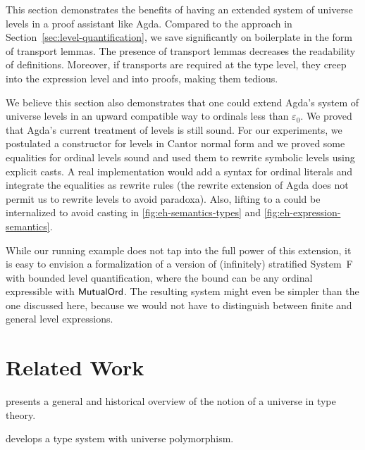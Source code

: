 \documentclass[manuscript,screen,review,anonymous]{acmart}
\begin{document}
This section demonstrates the benefits of having an extended system of
universe levels in a proof assistant like Agda. Compared to the
approach in Section~\cref{sec:level-quantification}, we save
significantly on boilerplate in the form of transport lemmas. The
presence of transport lemmas decreases the readability of
definitions. Moreover, if transports are required at the type level,
they creep into the expression level and into proofs, making them tedious.

We believe this section also demonstrates that one could extend Agda's
system of universe levels in an upward compatible way to ordinals less
than $\varepsilon_0$. We proved that Agda's current treatment of
levels is still sound. For our experiments, we postulated a
constructor for levels in Cantor normal form and we proved some
equalities for ordinal levels sound and used them to rewrite symbolic
levels using explicit casts. A real implementation would add a syntax
for ordinal literals and integrate the equalities as rewrite rules
(the rewrite extension of Agda does not permit us to rewrite levels to
avoid paradoxa). Also, lifting to a {\ABoundedLevel} could be
internalized to avoid casting in \cref{fig:eh-semantics-types} and
\cref{fig:eh-expression-semantics}. 


While our running example does not tap into the
full power of this extension, it is easy to envision a formalization
of a version of (infinitely) stratified System~F with bounded level quantification,
where the bound can be any ordinal expressible with $\AMutualOrd$. The
resulting system might even be simpler than the one discussed here,
because we would not have to distinguish between finite and general
level expressions.



\section{Related Work}
\label{sec:related-work}

\citet{10.1093/oso/9780198501275.003.0012} presents a general and
historical overview of the notion of a universe in type theory.

\citet{voevodsky14} develops a type system with universe polymorphism.

\citet{DBLP:conf/csl/Kovacs22}

\citet{DBLP:conf/types/BezemCDE22}
\end{document}
